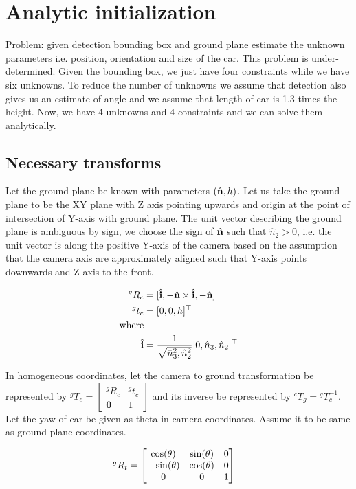\section{Analytic initialization}
Problem: given detection bounding box and ground plane estimate the unknown parameters i.e. position, orientation and size of the car. This problem is under-determined. Given the bounding box, we just have four constraints while we have six unknowns. To reduce the number of unknowns we assume that detection also gives us an estimate of angle and we assume that length of car is 1.3 times the height. Now, we have 4 unknowns and 4 constraints and we can solve them analytically.

\subsection{Necessary transforms}
Let the ground plane be known with parameters $(\hat{\mathbf{n}}, h)$. Let us take the ground plane to be the XY plane with Z axis pointing upwards and origin at the point of intersection of Y-axis with ground plane. The unit vector describing the ground plane is ambiguous by sign, we choose the sign of $\hat{\mathbf{n}}$ such that $\hat{n}_2 > 0$, i.e. the unit vector is along the positive Y-axis of the camera based on the assumption that the camera axis are approximately aligned such that Y-axis points downwards and Z-axis to the front.

\begin{align}
  ^gR_c &= [\hat{\mathbf{i}}, -\hat{\mathbf{n}} \times \hat{\mathbf{i}}, -\hat{\mathbf{n}}]\\
  ^gt_c &= [0, 0, h]^\top\\
        \text{where} & \\
 \hat{\mathbf{i}} &= \frac{1}{\sqrt{\hat{n}^2_3, \hat{n}^2_2}}[0, \hat{n}_3, \hat{n}_2]^\top
\end{align}

In homogeneous coordinates, let the camera to ground transformation be
represented by $^gT_c = \begin{bmatrix}^gR_c & ^gt_c\\ \mathbf{0} &
1\end{bmatrix}$ and its inverse be represented by $^cT_g = {}^gT_c^{-1}$. Let
the yaw of car be given as theta in camera coordinates. Assume it to be same as
ground plane coordinates.

\begin{align}
  {}^{g}{R}_{t} &= \begin{bmatrix}
  \cos(\theta) & \sin(\theta) & 0 \\
 -\sin(\theta) & \cos(\theta) & 0 \\
             0 & 0 & 1
  \end{bmatrix}
\end{align}

